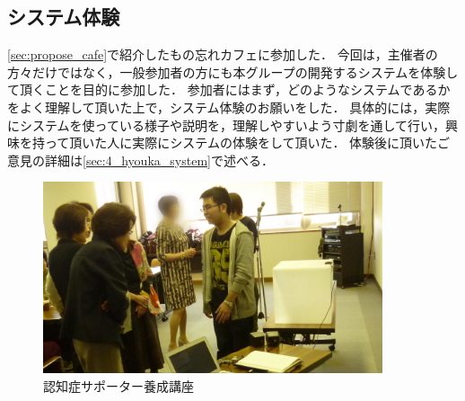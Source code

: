 \documentclass[../report]{subfiles}
\begin{document}
\subsection{システム体験}
\ref{sec:propose_cafe}で紹介したもの忘れカフェに参加した．
今回は，主催者の方々だけではなく，一般参加者の方にも本グループの開発するシステムを体験して頂くことを目的に参加した．
参加者にはまず，どのようなシステムであるかをよく理解して頂いた上で，システム体験のお願いをした．
具体的には，実際にシステムを使っている様子や説明を，理解しやすいよう寸劇を通して行い，興味を持って頂いた人に実際にシステムの体験をして頂いた．
体験後に頂いたご意見の詳細は\ref{sec:4_hyouka_system}で述べる．
\begin{figure}[htbp]
    \begin{center}
        \includegraphics[width=10cm]{imgs/2_system_taiken.jpg}
        \caption{認知症サポーター養成講座}
    \end{center}
\end{figure}
\end{document}
